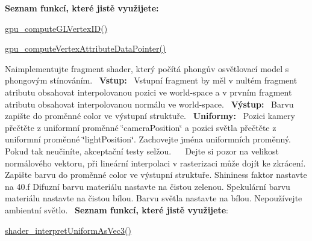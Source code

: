 \begin{DoxyRefList}
 {\bfseries Seznam funkcí, které jistě využijete\+:}
\begin{DoxyItemize}
\item \hyperlink{group__gpu__side_ga3983ddd2c559c1a6d1e1f1f37be3eae0}{gpu\+\_\+compute\+G\+L\+Vertex\+I\+D()}
\item \hyperlink{group__gpu__side_ga4b894f26ed3c06346da10fc6c41f90eb}{gpu\+\_\+compute\+Vertex\+Attribute\+Data\+Pointer()}  
\end{DoxyItemize}
\item[\label{todo__todo000009}%
\hypertarget{todo__todo000009}{}%
Global \hyperlink{group__shader__side_ga9cb61ad448e54a23ba4d01a6ebdb48eb}{phong\+\_\+fragment\+Shader} (\hyperlink{structGPUFragmentShaderOutput}{G\+P\+U\+Fragment\+Shader\+Output} $\ast$const output, \hyperlink{structGPUFragmentShaderInput}{G\+P\+U\+Fragment\+Shader\+Input} const $\ast$const input, G\+PU const gpu)]Naimplementujte fragment shader, který počítá phongův osvětlovací model s phongovým stínováním.~\newline
 {\bfseries Vstup\+:}~\newline
 Vstupní fragment by měl v nultém fragment atributu obsahovat interpolovanou pozici ve world-\/space a v prvním fragment atributu obsahovat interpolovanou normálu ve world-\/space.~\newline
 {\bfseries Výstup\+:}~\newline
 Barvu zapište do proměnné color ve výstupní struktuře.~\newline
 {\bfseries Uniformy\+:}~\newline
 Pozici kamery přečtěte z uniformní proměnné \char`\"{}camera\+Position\char`\"{} a pozici světla přečtěte z uniformní proměnné \char`\"{}light\+Position\char`\"{}. Zachovejte jména uniformních proměnný. Pokud tak neučiníte, akceptační testy selžou.~\newline
 ~\newline
 Dejte si pozor na velikost normálového vektoru, při lineární interpolaci v rasterizaci může dojít ke zkrácení. Zapište barvu do proměnné color ve výstupní struktuře. Shininess faktor nastavte na 40.\+f Difuzní barvu materiálu nastavte na čistou zelenou. Spekulární barvu materiálu nastavte na čistou bílou. Barvu světla nastavte na bílou. Nepoužívejte ambientní světlo.~\newline
 {\bfseries Seznam funkcí, které jistě využijete}\+:
\begin{DoxyItemize}
\item \hyperlink{uniforms_8h_a0466fe65842b5a08561b87670f366f55}{shader\+\_\+interpret\+Uniform\+As\+Vec3()}

\end{DoxyItemize}
\end{DoxyRefList}
